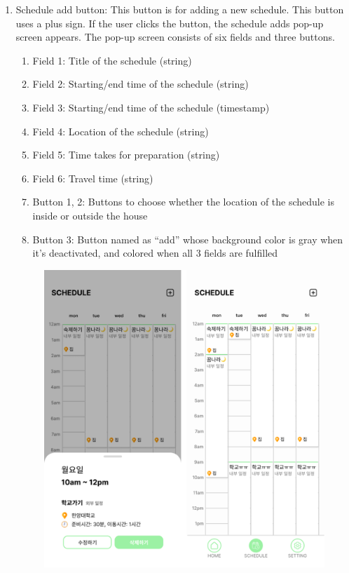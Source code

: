 \documentclass[conference]{IEEEtran}
\begin{document}
\begin{enumerate}[label=\arabic*.]
    \begin{enumerate}[label=\alph*.]
        \item {\large{Schedule add button: This button is for adding a new schedule. This button uses a plus sign. If the user clicks the button, the schedule adds pop-up screen appears. The pop-up screen consists of six fields and three buttons.}} \\
        \begin{enumerate}[label=\roman*.]
            \item {\large{Field 1: Title of the schedule (string)}} 
            \item {\large{Field 2: Starting/end time of the schedule (string)}} 
            \item {\large{Field 3: Starting/end time of the schedule (timestamp)}} 
            \item {\large{Field 4: Location of the schedule (string)}} 
            \item {\large{Field 5: Time takes for preparation (string)}} 
            \item {\large{Field 6: Travel time (string) }}   
            \item {\large{Button 1, 2: Buttons to choose whether the location of the schedule is inside or outside the house}} 
            \item {\large{Button 3: Button named as “add” whose background color is gray when it’s deactivated, and colored when all 3 fields are fulfilled}} \\            
        \end{enumerate}
        \begin{figure}[H]\centering \includegraphics[scale=0.4]{images/schedule.png}\end{figure}        

\end{enumerate}
\end{enumerate}
\end{document}
